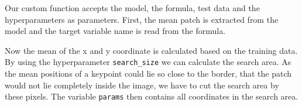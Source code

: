 \documentclass[]{article}
\newenvironment{Shaded}{\begin{snugshade}}{\end{snugshade}}
\newcommand{\KeywordTok}[1]{\textcolor[rgb]{0.13,0.29,0.53}{\textbf{{#1}}}}
\newcommand{\DataTypeTok}[1]{\textcolor[rgb]{0.13,0.29,0.53}{{#1}}}
\newcommand{\DecValTok}[1]{\textcolor[rgb]{0.00,0.00,0.81}{{#1}}}
\newcommand{\StringTok}[1]{\textcolor[rgb]{0.31,0.60,0.02}{{#1}}}
\newcommand{\CommentTok}[1]{\textcolor[rgb]{0.56,0.35,0.01}{\textit{{#1}}}}
\newcommand{\NormalTok}[1]{{#1}}
\begin{document}
Our custom function accepts the model, the formula, test data and the
hyperparameters as parameters. First, the mean patch is extracted from
the model and the target variable name is read from the formula.

\begin{Shaded}
\end{Shaded}

Now the mean of the x and y coordinate is calculated based on the
training data. By using the hyperparameter \texttt{search\_size} we can
calculate the search area. As the mean positions of a keypoint could lie
so close to the border, that the patch would not lie completely inside
the image, we have to cut the search area by these pixels. The variable
\texttt{params} then contains all coordinates in the search area.
\end{document}

